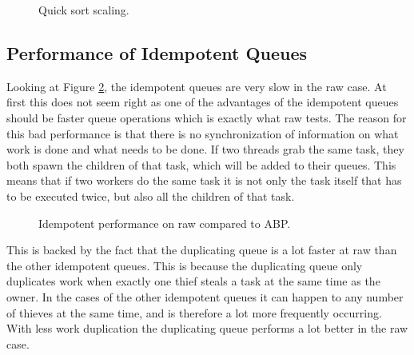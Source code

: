 \begin{figure}
\caption{Quick sort scaling.}
\label{fig:qsscaling}
\end{figure}

\subsection{Performance of Idempotent Queues}
Looking at Figure \ref{fig:idemraw}, the idempotent queues are very slow in the raw case. At first this does not seem right as one of the advantages of the idempotent queues should be faster queue operations which is exactly what raw tests. The reason for this bad performance is that there is no synchronization of information on what work is done and what needs to be done. If two threads grab the same task, they both spawn the children of that task, which will be added to their queues. This means that if two workers do the same task it is not only the task itself that has to be executed twice, but also all the children of that task.

\begin{figure}
\caption{Idempotent performance on raw compared to ABP.}
\label{fig:idemraw}
\end{figure}

This is backed by the fact that the duplicating queue is a lot faster at raw than the other idempotent queues. This is because the duplicating queue only duplicates work when exactly one thief steals a task at the same time as the owner. In the cases of the other idempotent queues it can happen to any number of thieves at the same time, and is therefore a lot more frequently occurring. With less work duplication the duplicating queue performs a lot better in the raw case.